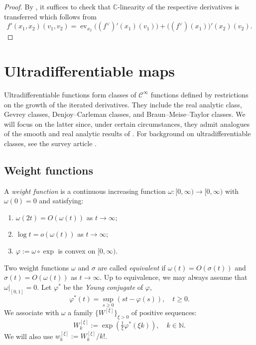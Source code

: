 \documentclass[10pt, reqno]{amsart}
\theoremstyle{plain}
\theoremstyle{definition}
\numberwithin{equation}{section}
\def\si{\sigma}
\def\vh{\varphi}
\def\om{\omega}
\def\C{\mathbb{C}}
\def\N{\mathbb{N}}
\def\cC{\mathcal{C}}
\renewcommand{\o}{\circ}
\let\on=\operatorname
\def\ev{\on{ev}}
\begin{document}
\begin{proof}
    By , it suffices to check that $\C$-linearity of the respective derivatives is transferred
    which follows from
    \[
        f'(x_1,x_2)(v_1,v_2) = \ev_{x_2} \big((f^\vee)'(x_1)(v_1)\big) + \big((f^\vee)(x_1)\big)'(x_2)(v_2).
    \]
\end{proof}


\section{Ultradifferentiable maps} \label{sec:ultra}

Ultradifferentiable functions form classes of $\cC^\infty$ functions defined by restrictions on the growth of 
the iterated derivatives. They include the real analytic class, Gevrey classes, Denjoy--Carleman classes, 
and Braun--Meise--Taylor classes.
We will focus on the latter since, under certain circumstances, they 
admit analogues of the smooth and real analytic results of . 
For background on ultradifferentiable classes, see the survey article \cite{Rainer:2021aa}. 


\subsection{Weight functions} \label{ssec:wf}

A \emph{weight function} is a continuous increasing function $\om : [0,\infty) \to [0,\infty)$ with $\om(0)=0$ and satisfying:
\begin{enumerate}
    \item $\om(2t) = O(\om(t))$ as $t \to \infty$;
    \item $\log t = o(\om(t))$ as $t \to \infty$;
    \item $\vh := \om \o \exp$ is convex on $[0,\infty)$.
\end{enumerate}
Two weight functions $\om$ and $\si$ are called \emph{equivalent} if $\om(t) = O(\si(t))$ and $\si(t)=O(\om(t))$ as $t \to \infty$.
Up to equivalence, we may always assume that $\om|_{[0,1]}=0$.
Let $\vh^*$ be the \emph{Young conjugate} of $\vh$,
\[
    \vh^*(t) = \sup_{s \ge 0} (st-\vh(s)),\quad t \ge 0.
\]
We associate with $\om$ a family $\{W^{[\xi]}\}_{\xi>0}$ of positive sequences:
\[
    W^{[\xi]}_k := \exp(\tfrac{1}{\xi} \vh^*(\xi k)), \quad k \in \N.
\]
We will also use $w^{[\xi]}_k := W^{[\xi]}_k/k!$.
\end{document}
